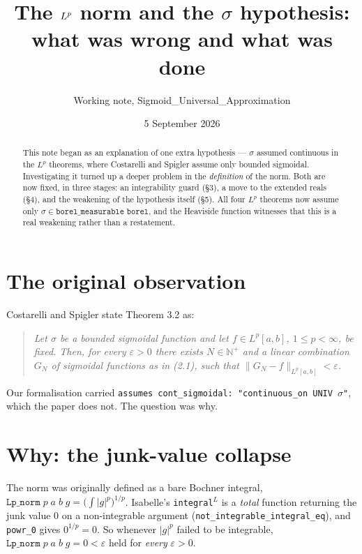 \documentclass[11pt,a4paper]{article}
\title{The $\Lp$ norm and the $\sigma$ hypothesis:\\ what was wrong and what was done}
\author{Working note, Sigmoid\_Universal\_Approximation}
\date{5 September 2026}
\newcommand{\Lp}{L^{p}}
\newcommand{\isa}[1]{\texttt{#1}}
\begin{document}
\maketitle

\begin{abstract}
\noindent
This note began as an explanation of one extra hypothesis --- $\sigma$ assumed continuous in
the $\Lp$ theorems, where Costarelli and Spigler assume only bounded sigmoidal. Investigating
it turned up a deeper problem in the \emph{definition} of the norm. Both are now fixed, in
three stages: an integrability guard (\S3), a move to the extended reals (\S4), and the
weakening of the hypothesis itself (\S5). All four $\Lp$ theorems now assume only
$\sigma\in\isa{borel\_measurable borel}$, and the Heaviside function witnesses that this is a
real weakening rather than a restatement.
\end{abstract}

\section{The original observation}

Costarelli and Spigler state Theorem 3.2 as:

\begin{quote}
\emph{Let $\sigma$ be a bounded sigmoidal function and let $f\in \Lp[a,b]$, $1\le p<\infty$, be
fixed. Then, for every $\varepsilon>0$ there exists $N\in\mathbb{N}^{+}$ and a linear
combination $G_N$ of sigmoidal functions as in (2.1), such that
$\|G_N-f\|_{\Lp[a,b]}<\varepsilon$.}
\end{quote}

Our formalisation carried \isa{assumes cont\_sigmoidal: "continuous\_on UNIV \(\sigma\)"},
which the paper does not. The question was why.

\section{Why: the junk-value collapse}

The norm was originally defined as a bare Bochner integral,
$\isa{Lp\_norm}\;p\;a\;b\;g = \bigl(\int |g|^{p}\bigr)^{1/p}$. Isabelle's
\isa{integral\(^{L}\)} is a \emph{total} function returning the junk value $0$ on a
non-integrable argument (\isa{not\_integrable\_integral\_eq}), and \isa{powr\_0} gives
$0^{1/p}=0$. So whenever $|g|^p$ failed to be integrable,
$\isa{Lp\_norm}\;p\;a\;b\;g = 0 < \varepsilon$ held for \emph{every} $\varepsilon>0$.
\end{document}
